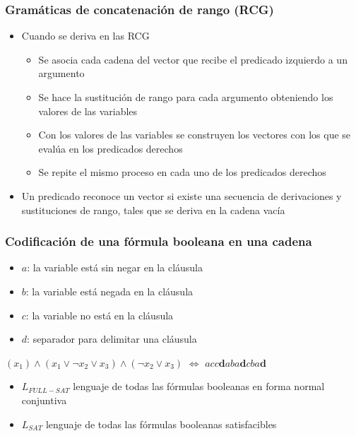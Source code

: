 \documentclass{beamer}
\begin{document}
\begin{frame}
    \frametitle{Gramáticas de concatenación de rango (RCG)}

    \begin{itemize}


        \item Cuando se deriva en las RCG
              \begin{itemize}
                  \item Se asocia cada cadena del vector que recibe el predicado izquierdo a un argumento
                  \item Se hace la sustitución de rango para cada argumento obteniendo los valores de las variables
                  \item Con los valores de las variables se construyen los vectores con los que se evalúa
                        en los predicados derechos
                  \item Se repite el mismo proceso en cada uno de los predicados derechos
              \end{itemize}
        \item Un predicado reconoce un vector si existe una secuencia de derivaciones y sustituciones de rango, tales
              que se deriva en la cadena vacía
    \end{itemize}
\end{frame}


\begin{frame}
    \frametitle{Codificación de una fórmula booleana en una cadena}

    \begin{itemize}
        \item $a$: la variable está sin negar en la cláusula
        \item $b$: la variable está negada en la cláusula
        \item $c$: la variable no está en la cláusula
        \item $d$: separador para delimitar una cláusula
    \end{itemize}

    \vspace{0.5cm}

    \begin{center}
        $(x_1)\wedge(x_1\vee \neg x_2 \vee x_3) \wedge (\neg x_2\vee x_3)$ $\Leftrightarrow$ $acc\mathbf{d}aba\mathbf{d}cba\mathbf{d}$
    \end{center}

    \vspace{0.5cm}

    \begin{itemize}
        \item $L_{FULL-SAT}$ lenguaje de todas las fórmulas booleanas en forma normal conjuntiva
        \item $L_{SAT}$ lenguaje de todas las fórmulas booleanas satisfacibles
    \end{itemize}
\end{frame}
\end{document}
